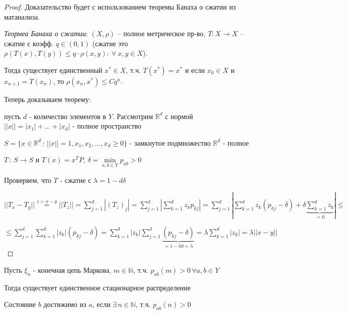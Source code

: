 \begin{proof}
    Доказательство будет с использованием теоремы Банаха о сжатии из матанализа.

    \begin{remark}
        \textit{Теормеа Банаха о сжатии}: $(X, \rho)$ -- полное метрическое пр-во, $T : X \rightarrow X$ -- сжатие с коэфф. $q \in (0, 1)$ (сжатие это $\rho(T(x), T(y)) \leq q \cdot \rho(x, y): \ \forall \ x, y \in X$).
        
        Тогда существует единственный $x^* \in X$, т.ч. $T(x^*) = x^*$ и если $x_0 \in X$ и $x_{n + 1} = T(x_n)$, то $\rho(x_n, x^*) \leq C q^n$.
    \end{remark}

    Теперь доказываем теорему:

    пусть $d$ - количество элементов в $Y$. Рассмотрим $\mathbb{R}^d$ с нормой $||x|| = |x_1| + \ldots + |x_d|$ - полное пространство

    $S = \{ x \in \mathbb{R}^d \, : \, ||x|| = 1, x_1, x_2, \ldots, x_d \geqslant 0 \}$ - замкнутое подмножество $\mathbb{R}^d$ - полное

    $T \, : \, S \to S$ и $T(x) = x^{T} P$, $\delta = \min\limits_{a, b \in Y} p_{ab} > 0$

    Проверяем, что $T$ - сжатие с $\lambda = 1 - d\delta$

    $||T_x - T_y|| \overset{z = x - y}{=} ||T_z|| = \sum\limits_{j = 1}^d |(T_z)_j| = \sum\limits_{j = 1}^d \left | \sum\limits_{k = 1}^d z_k p_{kj} \right | = 
    \sum\limits_{j = 1}^d \left | \sum\limits_{k = 1}^d z_k (p_{kj} - \delta) + \delta \underbrace{\sum\limits_{k = 1}^d z_k}_{= 0} \right | \leqslant$
    
    $\leqslant \sum\limits_{j = 1}^d \sum\limits_{k = 1}^d |z_k| (p_{kj} - \delta) = 
    \sum\limits_{k = 1}^d |z_k| \sum\limits_{j = 1}^d \underbrace{(p_{kj} - \delta)}_{=1 - \delta d = \lambda} = \lambda \sum\limits_{k = 1}^d |z_k| = \lambda ||x - y|| $
\end{proof}

\begin{remark}
    Пусть $\xi_n$ - конечная цепь Маркова, $m \in \mathbb{N}$, т.ч. $p_{ab} (m) > 0 \, \forall a, b \in Y$

    Тогда существует единственное стационарное распределение
\end{remark}

\begin{definition}
    Состояние $b$ достижимо из $a$, если $\exists \, n \in \mathbb{N}$, т.ч. $p_{ab} (n) > 0$
\end{definition}

